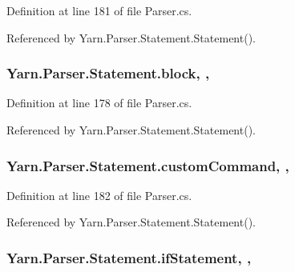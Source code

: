 Definition at line 181 of file Parser.\-cs.



Referenced by Yarn.\-Parser.\-Statement.\-Statement().

\hypertarget{a00156_ac14dfc7210974b4cd86402ed011fb0b6}{
\subsubsection[{block}]{ Yarn.\-Parser.\-Statement.\-block\hspace{0.3cm}{\ttfamily [get]}, {\ttfamily [set]}, {\ttfamily [package]}}}\label{a00156_ac14dfc7210974b4cd86402ed011fb0b6}


Definition at line 178 of file Parser.\-cs.



Referenced by Yarn.\-Parser.\-Statement.\-Statement().

\hypertarget{a00156_a8a98e7d4c66f9909da865f0e671d69f2}{
\subsubsection[{custom\-Command}]{ Yarn.\-Parser.\-Statement.\-custom\-Command\hspace{0.3cm}{\ttfamily [get]}, {\ttfamily [set]}, {\ttfamily [package]}}}\label{a00156_a8a98e7d4c66f9909da865f0e671d69f2}


Definition at line 182 of file Parser.\-cs.



Referenced by Yarn.\-Parser.\-Statement.\-Statement().

\hypertarget{a00156_a9a71577456598af0f25b23ccd02154e4}{
\subsubsection[{if\-Statement}]{ Yarn.\-Parser.\-Statement.\-if\-Statement\hspace{0.3cm}{\ttfamily [get]}, {\ttfamily [set]}, {\ttfamily [package]}}}\label{a00156_a9a71577456598af0f25b23ccd02154e4}


